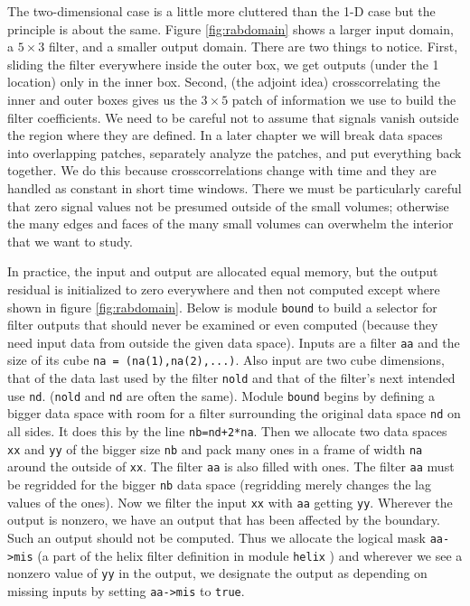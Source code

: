 \par
The two-dimensional case is a little more cluttered than the 1-D case
but the principle is about the same.
Figure \ref{fig:rabdomain} shows a larger input domain,
a $5\times 3$ filter, and a smaller output domain.
There are two things to notice.
First, sliding the filter everywhere inside the outer box,
we get outputs (under the 1 location) only in the inner box.
Second, (the adjoint idea) crosscorrelating the inner and outer boxes gives
us the $3\times 5$ patch of information
we use to build the filter coefficients.
We need to be careful not to assume
that signals vanish outside the region where they are defined.
In a later chapter we will break data spaces into overlapping patches,
separately analyze the patches, and put everything back together.
We do this because crosscorrelations change with time
and they are handled as constant in short time windows.
There we must be particularly careful that zero signal values not be presumed
outside of the small volumes;
otherwise the many edges and faces of the many small volumes
can overwhelm the interior that we want to study.

\par
In practice, the input and output are allocated equal memory,
but the output residual is initialized to zero everywhere
and then not computed
except where shown in figure \ref{fig:rabdomain}.
Below is module \texttt{bound}
to build a selector for filter outputs that should 
never be examined or even computed
(because they need input data from outside the given data space).
Inputs are a filter \texttt{aa}
and the size of its cube \texttt{na = (na(1),na(2),...)}.
Also input are two cube dimensions,
that of the data last used by the filter \texttt{nold} and
that of the filter's next intended use \texttt{nd}.
(\texttt{nold} and \texttt{nd} are often the same).
Module \texttt{bound}
begins by defining a bigger data space with room for a filter
surrounding the original data space \texttt{nd} on all sides.
It does this by the line \texttt{nb=nd+2*na}.
Then we allocate two data spaces
\texttt{xx} and \texttt{yy} of the bigger size \texttt{nb}
and pack many ones
in a frame of width \texttt{na} around the outside of \texttt{xx}.
The filter \texttt{aa} is also filled with ones.
The filter \texttt{aa} must be regridded for the bigger \texttt{nb}
data space (regridding merely changes the lag values of the ones).
Now we filter the input \texttt{xx} with \texttt{aa} getting \texttt{yy}.
Wherever the output is nonzero,
we have an output that has been affected by the boundary.
Such an output should not be computed.
Thus we allocate the logical mask \verb#aa->mis#
(a part of the helix filter definition
in module \texttt{helix} )
and wherever we see a nonzero value of \texttt{yy}
in the output,
we designate the output as depending on missing inputs by setting
\verb#aa->mis# to \texttt{true}.

